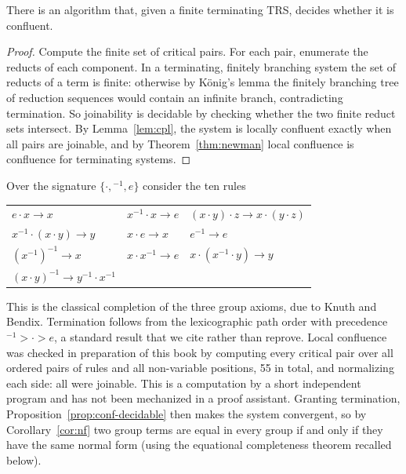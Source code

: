 \begin{proposition}
\label{prop:conf-decidable}
There is an algorithm that, given a finite terminating TRS, decides whether it is confluent.
\end{proposition}

\begin{proof}
Compute the finite set of critical pairs. For each pair, enumerate the reducts of each component. In a terminating, finitely branching system the set of reducts of a term is finite: otherwise by K\"onig's lemma the finitely branching tree of reduction sequences would contain an infinite branch, contradicting termination. So joinability is decidable by checking whether the two finite reduct sets intersect. By Lemma~\ref{lem:cpl}, the system is locally confluent exactly when all pairs are joinable, and by Theorem~\ref{thm:newman} local confluence is confluence for terminating systems.
\end{proof}

\begin{example}[Groups]
\label{ex:groups}
Over the signature $\{\cdot,{}^{-1},e\}$ consider the ten rules
\begin{center}
\begin{tabular}{lll}
$e\cdot x\to x$ & $x^{-1}\cdot x\to e$ & $(x\cdot y)\cdot z\to x\cdot(y\cdot z)$\\
$x^{-1}\cdot(x\cdot y)\to y$ & $x\cdot e\to x$ & $e^{-1}\to e$\\
$(x^{-1})^{-1}\to x$ & $x\cdot x^{-1}\to e$ & $x\cdot(x^{-1}\cdot y)\to y$\\
$(x\cdot y)^{-1}\to y^{-1}\cdot x^{-1}$
\end{tabular}
\end{center}
This is the classical completion of the three group axioms, due to Knuth and Bendix. Termination follows from the lexicographic path order with precedence $\mathord{}^{-1}>\cdot>e$, a standard result that we cite rather than reprove. Local confluence was checked in preparation of this book by computing every critical pair over all ordered pairs of rules and all non-variable positions, 55 in total, and normalizing each side: all were joinable. This is a computation by a short independent program and has not been mechanized in a proof assistant. Granting termination, Proposition~\ref{prop:conf-decidable} then makes the system convergent, so by Corollary~\ref{cor:nf} two group terms are equal in every group if and only if they have the same normal form (using the equational completeness theorem recalled below).
\end{example}

